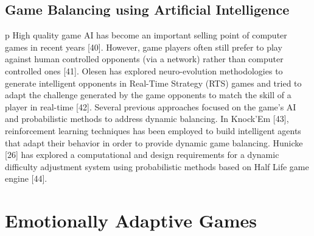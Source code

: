 \documentclass{uofsthesis-cs}
\begin{document}
\subsection{Game Balancing using Artificial Intelligence}
p High quality game AI has become an important selling point of computer games in recent years [40]. However, game players often still prefer to play against human controlled opponents (via a network) rather than computer controlled ones [41]. Olesen has explored neuro-evolution methodologies to generate intelligent opponents in Real-Time Strategy (RTS) games and tried to adapt the challenge generated by the game opponents to match the skill of a player in real-time [42]. Several previous approaches focused on the game’s AI and probabilistic methods to address dynamic balancing. In Knock’Em [43], reinforcement learning techniques has been employed to build intelligent agents that adapt their behavior in order to provide dynamic game balancing. Hunicke [26] has explored a computational and design requirements for a dynamic difficulty adjustment system using probabilistic methods based on Half Life game engine [44]. 


\section{Emotionally Adaptive Games}

\end{document}
